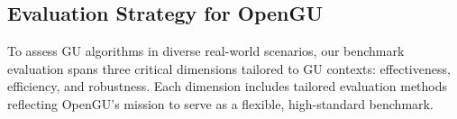 \vspace{-0.2cm}
\subsection{Evaluation Strategy for OpenGU}
\label{eva}

To assess GU algorithms in diverse real-world scenarios, our benchmark evaluation spans three critical dimensions tailored to GU contexts: effectiveness, efficiency, and robustness. Each dimension includes tailored evaluation methods reflecting OpenGU’s mission to serve as a flexible, high-standard benchmark.



